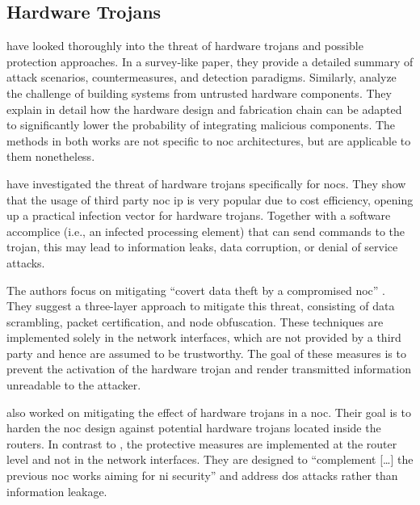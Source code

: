 \subsection{Hardware Trojans}
\citeauthor{bhunia14hardwaretrojans} \cite{bhunia14hardwaretrojans} have looked thoroughly into the threat of hardware trojans and possible protection
approaches. In a survey-like paper, they provide a detailed summary of attack scenarios, countermeasures, and detection paradigms. Similarly,
\citeauthor{sethumadhavan15trustworthyhardware} \cite{sethumadhavan15trustworthyhardware} analyze the challenge of building systems from untrusted
hardware components. They explain in detail how the hardware design and fabrication chain can be adapted to significantly lower the probability of
integrating malicious components. The methods in both works are not specific to \gls{noc} architectures, but are applicable to them nonetheless.

\citeauthor{ancajas14fortnocs} \cite{ancajas14fortnocs} have investigated the threat of hardware trojans specifically for \glspl{noc}. They show that the usage of
third party \gls{noc} \gls{ip} is very popular due to cost efficiency, opening up a practical infection vector for hardware
trojans. Together with a software accomplice (i.e., an infected processing element) that can send commands to the trojan, this may
lead to information leaks, data corruption, or denial of service attacks.

The authors focus on mitigating \enquote{covert data theft by a compromised \gls{noc}} \cite[3]{ancajas14fortnocs}. They suggest a three-layer
approach to mitigate this threat, consisting of data scrambling, packet certification, and node obfuscation. These techniques are
implemented solely in the network interfaces, which are not provided by a third party and hence are assumed to be trustworthy. The goal of these measures
is to prevent the activation of the hardware trojan and render transmitted information unreadable to the attacker.

\citeauthor{frey17hardenednoc} \cite{frey17hardenednoc} also worked on mitigating the effect of hardware trojans in a \gls{noc}. Their goal is to
harden the \gls{noc} design against potential hardware trojans located inside the routers. In contrast to \citeauthor{ancajas14fortnocs}
\cite{ancajas14fortnocs}, the protective measures are implemented at the router level and not in the network interfaces. They are designed to
\enquote{complement […] the previous \gls{noc} works aiming for \gls{ni} security} \cite[16]{frey17hardenednoc} and address \gls{dos} attacks rather
than information leakage.

